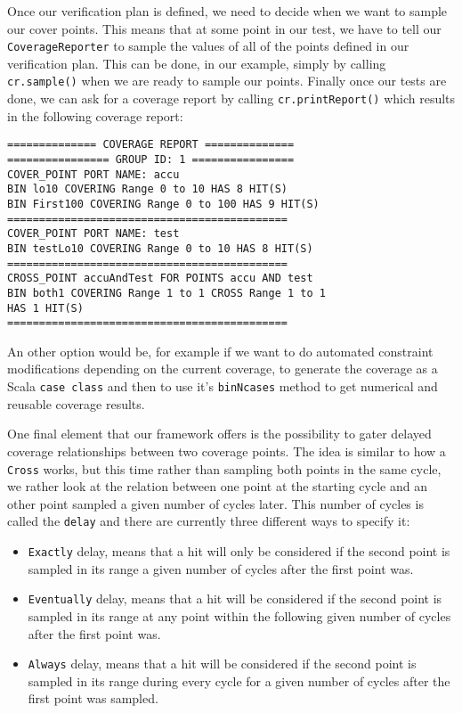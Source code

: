 \documentclass[conference]{IEEEtran}
\begin{document}
Once our verification plan is defined, we need to decide when we want to sample our cover points. This means that at some point in our test, we have to tell our \texttt{CoverageReporter} to sample the values of all of the points defined in our verification plan. This can be done, in our example, simply by calling \texttt{cr.sample()} when we are ready to sample our points. Finally once our tests are done, we can ask for a coverage report by calling \texttt{cr.printReport()} which results in the following coverage report: 
\begin{verbatim}
============== COVERAGE REPORT ==============
================ GROUP ID: 1 ================
COVER_POINT PORT NAME: accu
BIN lo10 COVERING Range 0 to 10 HAS 8 HIT(S)
BIN First100 COVERING Range 0 to 100 HAS 9 HIT(S)
============================================
COVER_POINT PORT NAME: test
BIN testLo10 COVERING Range 0 to 10 HAS 8 HIT(S)
============================================
CROSS_POINT accuAndTest FOR POINTS accu AND test
BIN both1 COVERING Range 1 to 1 CROSS Range 1 to 1 
HAS 1 HIT(S)
============================================
\end{verbatim}
An other option would be, for example if we want to do automated constraint modifications depending on the current coverage, to generate the coverage as a Scala \texttt{case class} and then to use it's \texttt{binNcases} method to get numerical and reusable coverage results.  
  
One final element that our framework offers is the possibility to gater delayed coverage relationships between two coverage points. The idea is similar to how a \texttt{Cross} works, but this time rather than sampling both points in the same cycle, we rather look at the relation between one point at the starting cycle and an other point sampled a given number of cycles later. This number of cycles is called the \texttt{delay} and there are currently three different ways to specify it:  
\begin{itemize}
 \item \texttt{Exactly} delay, means that a hit will only be considered if the second point is sampled in its range a given number of cycles after the first point was.
 \item \texttt{Eventually} delay, means that a hit will be considered if the second point is sampled in its range at any point within the following given number of cycles after the first point was.  
 \item \texttt{Always} delay, means that a hit will be considered if the second point is sampled in its range during every cycle for a given number of cycles after the first point was sampled.
\end{itemize}
\end{document}

